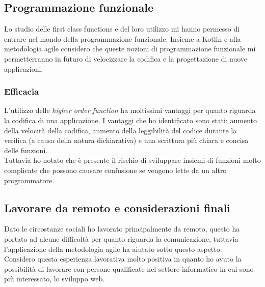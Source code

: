 \subsection{Programmazione funzionale}
Lo studio delle first class functions e del loro utilizzo mi hanno permesso di entrare nel mondo della programmazione funzionale. Insieme a Kotlin e alla metodologia agile considero che queste nozioni di programmazione funzionale mi permetterranno in futuro di velocizzare la codifica e la progettazione di nuove applicazioni.

\subsubsection*{Efficacia}
L'utilizzo delle \emph{higher order function} ha moltissimi vantaggi per quanto riguarda la codifica di una applicazione. I vantaggi che ho identificato sono stati: aumento della velocità della codifica, aumento della leggibilità del codice durante la verifica (a causa della natura dichiarativa) e una scrittura più chiara e concisa delle funzioni. \\
Tuttavia ho notato che è presente il rischio di sviluppare insiemi di funzioni molto complicate che possono causare confusione se vengono lette da un altro programmatore.

\subsection{Lavorare da remoto e considerazioni finali}
Dato le circostanze sociali ho lavorato principalmente da remoto, questo ha portato ad alcune difficoltà per quanto riguarda la comunicazione, tuttavia l'applicazione della metodologia agile ha aiutato sotto questo aspetto. \\ 
Considero questa esperienza lavorativa molto positiva in quanto ho avuto la possibilità di lavorare con persone qualificate nel settore informatico in cui sono più interessato, lo sviluppo web. 
